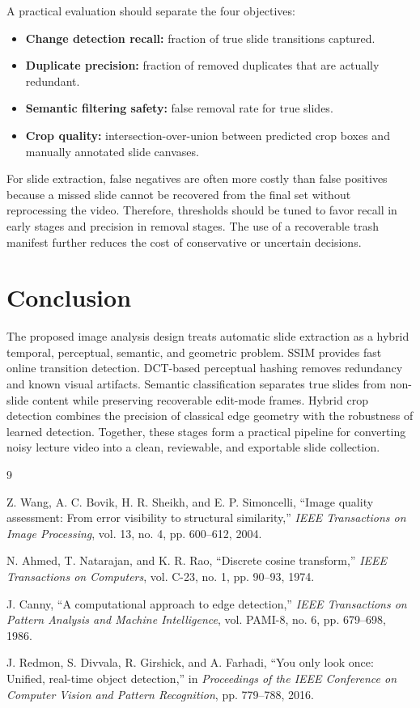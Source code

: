 \documentclass[11pt]{article}
\begin{document}
A practical evaluation should separate the four objectives:
\begin{itemize}
  \item \textbf{Change detection recall:} fraction of true slide transitions captured.
  \item \textbf{Duplicate precision:} fraction of removed duplicates that are actually redundant.
  \item \textbf{Semantic filtering safety:} false removal rate for true slides.
  \item \textbf{Crop quality:} intersection-over-union between predicted crop boxes and manually annotated slide canvases.
\end{itemize}

For slide extraction, false negatives are often more costly than false positives because a missed slide cannot be recovered from the final set without reprocessing the video. Therefore, thresholds should be tuned to favor recall in early stages and precision in removal stages. The use of a recoverable trash manifest further reduces the cost of conservative or uncertain decisions.

\section{Conclusion}

The proposed image analysis design treats automatic slide extraction as a hybrid temporal, perceptual, semantic, and geometric problem. SSIM provides fast online transition detection. DCT-based perceptual hashing removes redundancy and known visual artifacts. Semantic classification separates true slides from non-slide content while preserving recoverable edit-mode frames. Hybrid crop detection combines the precision of classical edge geometry with the robustness of learned detection. Together, these stages form a practical pipeline for converting noisy lecture video into a clean, reviewable, and exportable slide collection.

\begin{thebibliography}{9}

Z. Wang, A. C. Bovik, H. R. Sheikh, and E. P. Simoncelli,
``Image quality assessment: From error visibility to structural similarity,''
\emph{IEEE Transactions on Image Processing}, vol. 13, no. 4, pp. 600--612, 2004.

N. Ahmed, T. Natarajan, and K. R. Rao,
``Discrete cosine transform,''
\emph{IEEE Transactions on Computers}, vol. C-23, no. 1, pp. 90--93, 1974.

J. Canny,
``A computational approach to edge detection,''
\emph{IEEE Transactions on Pattern Analysis and Machine Intelligence}, vol. PAMI-8, no. 6, pp. 679--698, 1986.

J. Redmon, S. Divvala, R. Girshick, and A. Farhadi,
``You only look once: Unified, real-time object detection,''
in \emph{Proceedings of the IEEE Conference on Computer Vision and Pattern Recognition}, pp. 779--788, 2016.

\end{thebibliography}
\end{document}
